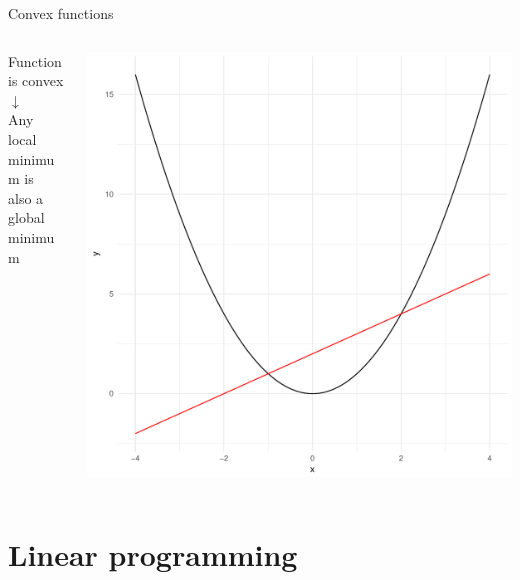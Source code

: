 \documentclass[12pt,aspectratio=169]{beamer}
\begin{document}
\begin{frame}{Convex functions}
    \begin{columns}
        \begin{column}{0.5\textwidth}
            \centering
            Function is \alert{convex} \\[1em]
            $\downarrow$ \\[1em]
            Any local minimum is \\ also a global minimum
        \end{column}
        \begin{column}{0.5\textwidth}
            \includegraphics[height=0.85\textheight]{figures/convex_fun}
        \end{column}
    \end{columns}
\end{frame}

\section{Linear programming}
\end{document}
